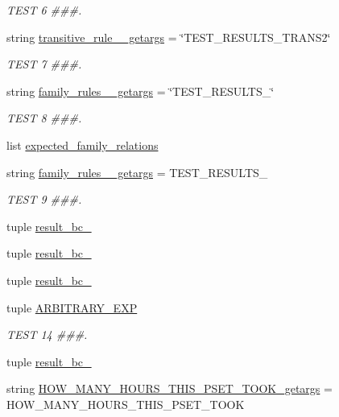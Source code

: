 \begin{DoxyCompactItemize}
\begin{DoxyCompactList}\small\item\em T\+E\+S\+T 6 \#\#\#. \end{DoxyCompactList}\item 
string \hyperlink{namespacetests_a7e17149eb31661fd855e43033e0313ec}{transitive\+\_\+rule\+\_\+\_\+getargs} = \char`\"{}T\+E\+S\+T\+\_\+\+R\+E\+S\+U\+L\+T\+S\+\_\+\+T\+R\+A\+N\+S2\char`\"{}
\begin{DoxyCompactList}\small\item\em T\+E\+S\+T 7 \#\#\#. \end{DoxyCompactList}\item 
string \hyperlink{namespacetests_a68495c75d747bdf4a92ed522c37759ae}{family\+\_\+rules\+\_\+\_\+getargs} = \char`\"{}T\+E\+S\+T\+\_\+\+R\+E\+S\+U\+L\+T\+S\+\_\char`\"{}
\begin{DoxyCompactList}\small\item\em T\+E\+S\+T 8 \#\#\#. \end{DoxyCompactList}\item 
list \hyperlink{namespacetests_a6f541fd17dfa0fecf1cae81098cae4fd}{expected\+\_\+family\+\_\+relations}
\item 
string \hyperlink{namespacetests_afd1704baf70a82cfa545df15dce643e8}{family\+\_\+rules\+\_\+\_\+getargs} = \textquotesingle{}T\+E\+S\+T\+\_\+\+R\+E\+S\+U\+L\+T\+S\+\_\textquotesingle{}
\begin{DoxyCompactList}\small\item\em T\+E\+S\+T 9 \#\#\#. \end{DoxyCompactList}\item 
tuple \hyperlink{namespacetests_abf2e7e3c18ce87b2d297bfafb30f9c34}{result\+\_\+bc\+\_}
\item 
tuple \hyperlink{namespacetests_ad1264ea8fc62114c2cce09081940562d}{result\+\_\+bc\+\_}
\item 
tuple \hyperlink{namespacetests_a4b7edf1f7e8c1edcf3a812b38c637223}{result\+\_\+bc\+\_}
\item 
tuple \hyperlink{namespacetests_a272abf0a7c07eae1ba1918ee56ea1610}{A\+R\+B\+I\+T\+R\+A\+R\+Y\+\_\+\+E\+X\+P}
\begin{DoxyCompactList}\small\item\em T\+E\+S\+T 14 \#\#\#. \end{DoxyCompactList}\item 
tuple \hyperlink{namespacetests_a3c4894e10dff7d903a438b725ab36dc5}{result\+\_\+bc\+\_}
\item 
string \hyperlink{namespacetests_a94aac3be859329ae064e39e582dc4ba3}{H\+O\+W\+\_\+\+M\+A\+N\+Y\+\_\+\+H\+O\+U\+R\+S\+\_\+\+T\+H\+I\+S\+\_\+\+P\+S\+E\+T\+\_\+\+T\+O\+O\+K\+\_\+getargs} = \textquotesingle{}H\+O\+W\+\_\+\+M\+A\+N\+Y\+\_\+\+H\+O\+U\+R\+S\+\_\+\+T\+H\+I\+S\+\_\+\+P\+S\+E\+T\+\_\+\+T\+O\+O\+K\textquotesingle{}

\end{DoxyCompactItemize}
